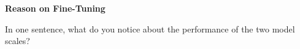 \item {} {\bf Reason on Fine-Tuning}

In one sentence, what do you notice about the performance of the two model scales?

\clearpage
